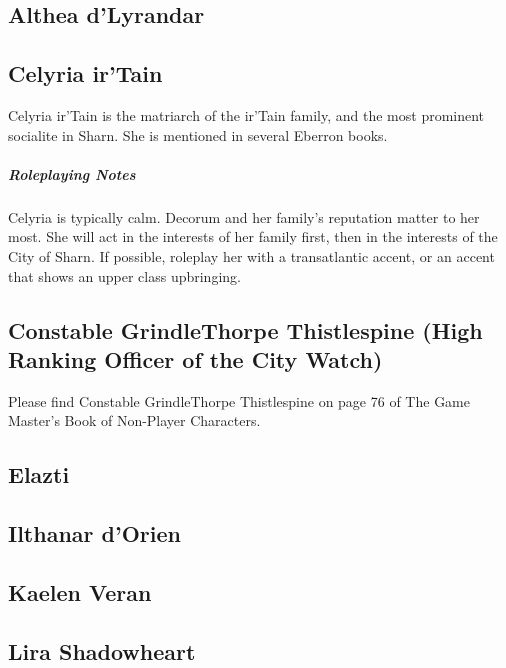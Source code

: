 \documentclass[twocolumn]{dndbook}
\begin{document}
\subsection{Althea d'Lyrandar}
\label{subsec:althea_dlyrandar}


\subsection{Celyria ir'Tain}
\label{subsec:celyria_irtain}
Celyria ir'Tain is the matriarch of the ir'Tain family, and the most prominent socialite in Sharn.
She is mentioned in several Eberron books.

\subparagraph*{Roleplaying Notes} Celyria is typically calm.
Decorum and her family's reputation matter to her most.
She will act in the interests of her family first, then in the interests of the City of Sharn.
If possible, roleplay her with a transatlantic accent, or an accent that shows an upper class upbringing.

\subsection{Constable GrindleThorpe Thistlespine (High Ranking Officer of the City Watch)}
\label{subsec:constable_grindlethorpe_thistlespine}

Please find Constable GrindleThorpe Thistlespine on page 76 of The Game Master's Book of Non-Player Characters.


\subsection{Elazti}
\label{subsec:elazti}

\subsection{Ilthanar d'Orien}
\label{subsec:ilthanar_dorien}

\subsection{Kaelen Veran}
\label{subsec:kaelen_veran}

\subsection{Lira Shadowheart}
\label{subsec:lira_shadowheart}
\end{document}
